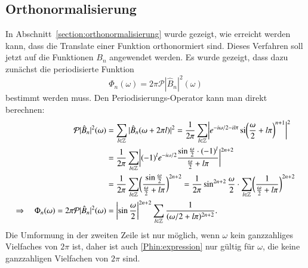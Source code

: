 \subsection{Orthonormalisierung
\label{subsection:spline-orthonormalisierung}}
In Abschnitt~\ref{section:orthonormalisierung} wurde gezeigt, wie 
erreicht werden kann, dass die Translate einer Funktion orthonormiert
sind.
Dieses Verfahren soll jetzt auf die Funktionen $B_n$ angewendet werden.
Es wurde gezeigt, dass dazu zunächst die periodisierte Funktion
\[
\Phi_n(\omega)
=
2\pi \mathcal{P}|\hat{B}_n|^2(\omega)
\]
bestimmt werden muss. 
Den Periodisierungs-Operator kann man direkt berechnen:
\begin{align}
\mathcal{P} |\hat{B}_n|^2(\omega)
&=
\sum_{l\in\mathbb Z} |\hat{B}_n(\omega + 2\pi l)|^2
=
\frac{1}{2\pi}
\sum_{l\in\mathbb Z}
\biggl|
e^{-i\omega/2 -il\pi}
\si\biggl(\frac{\omega}2+l\pi\biggr)^{n+1}
\biggr|^2
\notag
\\
&=
\frac{1}{2\pi}
\sum_{l\in\mathbb Z}
\biggl|
(-1)^l
e^{-i\omega/2}
\frac{\sin\frac{\omega}2 \cdot (-1)^l}{\frac{\omega}2 + l\pi}
\biggr|^{2n+2}
\notag
\\
&=
\frac{1}{2\pi}
\sum_{l\in\mathbb Z}
\biggl(
\frac{\sin\frac{\omega}2}{\frac{\omega}2 + l\pi}
\biggr)^{2n+2}
=
\frac{1}{2\pi}
\sin^{2n+2}\frac{\omega}2
\cdot
\sum_{l\in\mathbb Z}
\biggl(
\frac{1}{\frac{\omega}2 + l\pi}
\biggr)^{2n+2}
\notag
\\
\Rightarrow\quad
\Phi_n(\omega)
=
2\pi\mathcal{P}|\hat{B}_n|^2(\omega)
&=
\biggl|\sin\frac{\omega}2\biggr|^{2n+2}
\sum_{l\in\mathbb Z}
\frac{1}{(\omega/2 + l\pi)^{2n+2}}
.
\label{Phin:expression}
\end{align}
Die Umformung in der zweiten Zeile ist nur möglich, wenn $\omega$
kein ganzzahliges Vielfaches von $2\pi$ ist, daher ist auch
\eqref{Phin:expression} nur gültig für $\omega$, die keine ganzzahligen
Vielfachen von $2\pi$ sind.

